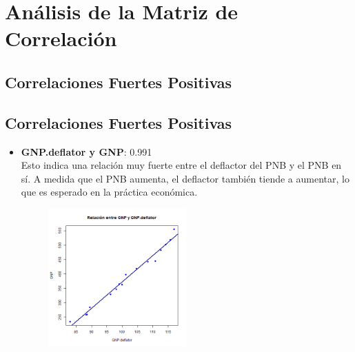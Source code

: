 \documentclass{article}
\begin{document}
\section{Análisis de la Matriz de Correlación}

\subsection{Correlaciones Fuertes Positivas}

\subsection{Correlaciones Fuertes Positivas}

\begin{itemize}
    \item \textbf{GNP.deflator y GNP}: 0.991\\
    Esto indica una relación muy fuerte entre el deflactor del PNB y el PNB en sí. A medida que el PNB aumenta, el deflactor también tiende a aumentar, lo que es esperado en la práctica económica.
    \begin{figure}[H]
        \centering
        \includegraphics[width=0.5\textwidth]{Graficos_Dispersion/GNP.deflator_vs_GNP.png}
        \label{fig:GNP.deflator_vs_GNP}
        \vspace{0.5cm} %
    \end{figure}


\end{itemize}
\end{document}
